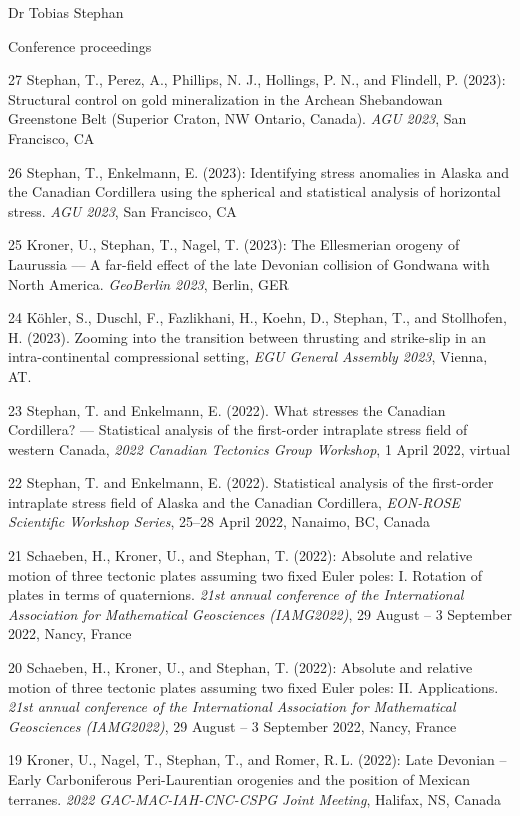 \documentclass[10pt, paper=letter]{scrartcl} %
\begin{document}
\begin{cv}{Dr Tobias Stephan}
\begin{cvlist}{Conference proceedings}
    \item[27] Stephan, T., Perez, A., Phillips, N. J., Hollings, P. N., and Flindell, P. (2023): Structural control on gold mineralization in the Archean Shebandowan Greenstone Belt (Superior Craton, NW Ontario, Canada). \textit{AGU 2023}, San Francisco, CA
    \item[26] Stephan, T., Enkelmann, E. (2023): Identifying stress anomalies in Alaska and the Canadian Cordillera using the spherical and statistical analysis of horizontal stress. \textit{AGU 2023}, San Francisco, CA
    \item[25] Kroner, U., Stephan, T., Nagel, T. (2023): The Ellesmerian orogeny of Laurussia –-- A far-field effect of the late Devonian collision of Gondwana with North America. \textit{GeoBerlin 2023}, Berlin, GER
    \item[24] K\"ohler, S., Duschl, F., Fazlikhani, H., Koehn, D., Stephan, T., and Stollhofen, H. (2023).  Zooming into the transition between thrusting and strike-slip in an intra-continental compressional setting, \textit{EGU General Assembly 2023}, Vienna, AT. 
    \item[23] Stephan, T. and Enkelmann, E. (2022). What stresses the Canadian Cordillera? --- Statistical analysis of the first-order intraplate stress field of western Canada, \textit{2022 Canadian Tectonics Group Workshop}, 1 April 2022, virtual
    \item[22] Stephan, T. and Enkelmann, E. (2022). Statistical analysis of the first-order intraplate stress field of Alaska and the Canadian Cordillera, \textit{EON-ROSE Scientific Workshop Series}, 25--28 April 2022, Nanaimo, BC, Canada
    \item[21] Schaeben, H., Kroner, U., and Stephan, T. (2022): Absolute and relative motion of three tectonic plates assuming two fixed Euler poles: I. Rotation of plates in terms of quaternions. \textit{21st annual conference of the International Association for Mathematical Geosciences (IAMG2022)}, 29 August -- 3 September 2022, Nancy, France
    \item[20] Schaeben, H., Kroner, U., and Stephan, T. (2022): Absolute and relative motion of three tectonic plates assuming two fixed Euler poles: II. Applications. \textit{21st annual conference of the International Association for Mathematical Geosciences (IAMG2022)}, 29 August -- 3 September 2022, Nancy, France
    \item[19] Kroner, U., Nagel, T., Stephan, T., and Romer, R.\,L. (2022): Late Devonian – Early Carboniferous Peri-Laurentian orogenies and the position of Mexican terranes. \textit{2022 GAC-MAC-IAH-CNC-CSPG Joint Meeting}, Halifax, NS, Canada

\end{cvlist}
\end{cv}
\end{document}

